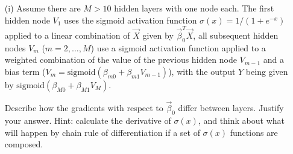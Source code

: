 \documentclass[11pt]{article}
\begin{document}
\begin{itemize}

\item[(i)] Assume there are $M>10$ hidden layers with one node each.  The first hidden node $V_1$ uses the sigmoid activation function $\sigma(x) = 1/(1 + e^{-x})$ applied to a linear combination of $\vec{X}$ given by $\vec{\beta}_0^T \vec{X}$, all subsequent hidden nodes $V_m$ ($m = 2, \ldots, M$) use a sigmoid activation function applied to a weighted combination of the value of the previous hidden node $V_{m-1}$ and a bias term ($V_m = \text{sigmoid}(\beta_{m0} + \beta_{m1} V_{m-1})$), with the output $Y$ being given by $\text{sigmoid}(\beta_{M0} + \beta_{M1} V_M)$.

Describe how the gradients with respect to $\vec{\beta}_0$ differ between layers. Justify your answer.
Hint: calculate the derivative of $\sigma(x)$, and think about what will happen by chain rule of differentiation if a set of $\sigma(x)$ functions are composed.


\end{itemize}
\end{document}

